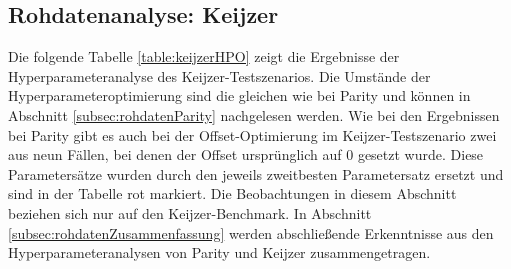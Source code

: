 \subsection{Rohdatenanalyse: Keijzer}
\label{subsec:rohdatenKeijzer}

Die folgende Tabelle \ref{table:keijzerHPO} zeigt die Ergebnisse der Hyperparameteranalyse des Keijzer-Testszenarios.
Die Umstände der Hyperparameteroptimierung sind die gleichen wie bei Parity und können in Abschnitt \ref{subsec:rohdatenParity} nachgelesen werden.
Wie bei den Ergebnissen bei Parity gibt es auch bei der Offset-Optimierung im Keijzer-Testszenario zwei aus neun Fällen, bei denen der Offset ursprünglich auf 0 gesetzt wurde.
Diese Parametersätze wurden durch den jeweils zweitbesten Parametersatz ersetzt und sind in der Tabelle rot markiert.
Die Beobachtungen in diesem Abschnitt beziehen sich nur auf den Keijzer-Benchmark.
In Abschnitt \ref{subsec:rohdatenZusammenfassung} werden abschließende Erkenntnisse aus den Hyperparameteranalysen von Parity und Keijzer zusammengetragen.

